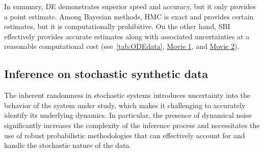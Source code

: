 \documentclass[preprint,11pt,authoryear]{elsarticle}
\begin{document}
In summary, DE demonstrates superior speed and accuracy, but it only provides a point estimate. Among Bayesian methods, HMC is exact and provides certain estimates, but it is computationally prohibitive. On the other hand, SBI effectively provides accurate estimates along with associated uncertainties at a reasonable computational cost (see~\autoref{tab:ODEdata},  \href{run:https://github.com/ins-amu/Inference_MFM/blob/main/Videos/Movie1_MPR_ODE_HMC_RV.mp4}{Movie 1}, and  \href{run:https://github.com/ins-amu/Inference_MFM/blob/main/Videos/Movie2_MPR_ODE_SBI_RV.mp4}{Movie 2}). 



\subsection{Inference on stochastic synthetic data}

The inherent randomness in stochastic systems introduces uncertainty into the behavior of the system under study, which makes it challenging to accurately identify its underlying dynamics. In particular, the presence of dynamical noise significantly increases the complexity of the inference process and necessitates the use of robust probabilistic methodologies that can effectively account for and handle the stochastic nature of the data. 
\end{document}
